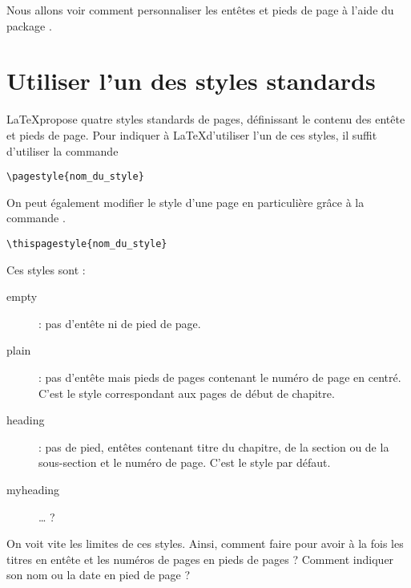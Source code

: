 
\begin{prealable}
Nous allons voir comment personnaliser les entêtes et pieds de page à l'aide du package .
\end{prealable}


\section{Utiliser l'un des styles standards}\label{stylesentete}

\LaTeX propose quatre styles standards de pages, définissant le contenu des entête et pieds de page. Pour indiquer à \LaTeX d'utiliser l'un de ces styles, il suffit d'utiliser la commande 
\begin{verbatim}
\pagestyle{nom_du_style}
\end{verbatim} 

On peut également modifier le style d'une page en particulière grâce à la commande .

\begin{verbatim}
\thispagestyle{nom_du_style}
\end{verbatim} 

Ces styles sont :
\begin{description}
\item[empty]: pas d'entête ni de pied de page.
\item[plain]: pas d'entête mais pieds de pages contenant le numéro de page en centré. C'est le style correspondant aux pages de début de chapitre. 
\item[heading]: pas de pied, entêtes contenant titre du chapitre, de la section ou de la sous-section et le numéro de page. C'est le style par défaut.
\item[myheading] … ?
\end{description}



On voit vite les limites de ces styles. Ainsi, comment faire pour avoir à la fois les titres en entête et les numéros de pages en pieds de pages ? Comment indiquer son nom ou la date en pied de page ?

